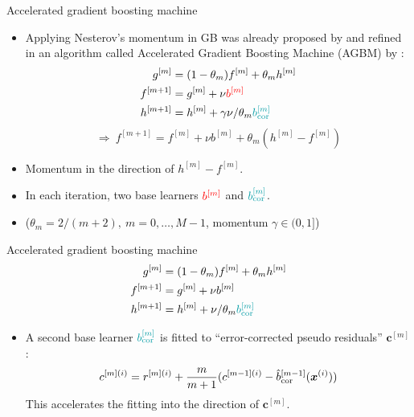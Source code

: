 \documentclass[t,10pt]{beamer}
\begin{document}
\begin{frame}{Accelerated gradient boosting machine}
  \begin{itemize}
    \item
      Applying Nesterov's momentum in GB was already proposed by \cite{biau2019accelerated} and refined in an algorithm called Accelerated Gradient Boosting Machine (AGBM) by \cite{lu2020accelerating}:
      \begin{align*}
      g^{[m]} &= (1 - \theta_m) f^{[m]} + \theta_m h^{[m]}\\
      f^{[m+1]} &= g^{[m]} + \nu {\color{red}b^{[m]}} \\
      h^{[m+1]} &= h^{[m]} + \gamma\nu / \theta_m {\color{blue}b^{[m]}_{\text{cor}}}
      \end{align*}
      \[\Rightarrow\ f^{[m+1]} = f^{[m]} + \nu b^{[m]} + \theta_m (h^{[m]} - f^{[m]})\]%
    \item Momentum in the direction of $h^{[m]} - f^{[m]}$.
    \item In each iteration, two base learners ${\color{red}b^{[m]}}$ and ${\color{blue}b^{[m]}_{\text{cor}}}$.
    \item ($\theta_m = 2 / (m+2),\ m = 0, \dots, M - 1$, momentum $\gamma \in (0,1]$)
  \end{itemize}
  \addtocounter{framenumber}{-1}
\end{frame}

\begin{frame}{Accelerated gradient boosting machine}
      \begin{align*}
      g^{[m]} &= (1 - \theta_m) f^{[m]} + \theta_m h^{[m]}\\
      f^{[m+1]} &=g^{[m]} + \nu b^{[m]} \\
      h^{[m+1]} &= h^{[m]} + \nu / \theta_m \textcolor{blue}{b^{[m]}_{\text{cor}}}
      \end{align*}  
      \begin{itemize}
    \item
      A second base learner $\textcolor{blue}{b^{[m]}_{\text{cor}}}$ is fitted to \enquote{error-corrected pseudo residuals} $\bm{c}^{[m]}$:
      \[c^{[m](i)} = r^{[m](i)} + \frac{m}{m+1}(c^{[m-1](i)} - \hat{b}_{\text{cor}}^{[m-1]}(\bm{x}^{(i)}))\]
      This accelerates the fitting into the direction of $\bm{c}^{[m]}$.
  \end{itemize}
\end{frame}
\end{document}
